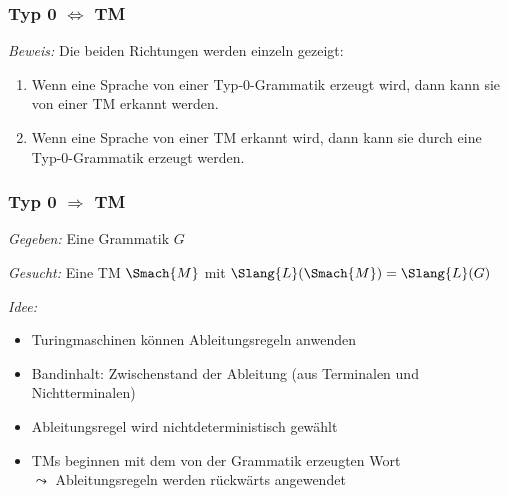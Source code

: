 \documentclass[aspectratio=1610,onlymath]{beamer}
\begin{document}
\begin{frame}\frametitle{Typ 0 $\Leftrightarrow$ TM}

\medskip

\emph{Beweis:} Die beiden Richtungen werden einzeln gezeigt:
\begin{enumerate}[(1)]
\item Wenn eine Sprache von einer Typ-0-Grammatik erzeugt wird, dann kann sie von einer TM erkannt werden.
\item Wenn eine Sprache von einer TM erkannt wird, dann kann sie durch eine Typ-0-Grammatik erzeugt werden.
\end{enumerate}

\end{frame}

\begin{frame}\frametitle{Typ 0 $\Rightarrow$ TM}

\emph{Gegeben:} Eine Grammatik $G$
\medskip

\emph{Gesucht:} Eine TM $\Smach{M}$ mit $\Slang{L}(\Smach{M})=\Slang{L}(G)$
\medskip\pause

\emph{Idee:}
\begin{itemize}
\item Turingmaschinen können Ableitungsregeln anwenden
\item Bandinhalt: Zwischenstand der Ableitung (aus Terminalen und Nichtterminalen)
\item Ableitungsregel wird nichtdeterministisch gewählt
\item TMs beginnen mit dem von der Grammatik erzeugten Wort\\$\leadsto$ Ableitungsregeln werden rückwärts angewendet
\end{itemize}

\end{frame}
\end{document}
